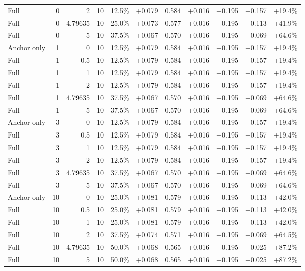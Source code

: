 \begin{table}[htbp]
\begin{tabular}{lrrrccccccc}
Full & 0 & 2 & 10 & 12.5\% & +0.079 & 0.584 & +0.016 & +0.195 & +0.157 & +19.4\% \\
Full & 0 & 4.79635 & 10 & 25.0\% & +0.073 & 0.577 & +0.016 & +0.195 & +0.113 & +41.9\% \\
Full & 0 & 5 & 10 & 37.5\% & +0.067 & 0.570 & +0.016 & +0.195 & +0.069 & +64.6\% \\
Anchor only & 1 & 0 & 10 & 12.5\% & +0.079 & 0.584 & +0.016 & +0.195 & +0.157 & +19.4\% \\
Full & 1 & 0.5 & 10 & 12.5\% & +0.079 & 0.584 & +0.016 & +0.195 & +0.157 & +19.4\% \\
Full & 1 & 1 & 10 & 12.5\% & +0.079 & 0.584 & +0.016 & +0.195 & +0.157 & +19.4\% \\
Full & 1 & 2 & 10 & 12.5\% & +0.079 & 0.584 & +0.016 & +0.195 & +0.157 & +19.4\% \\
Full & 1 & 4.79635 & 10 & 37.5\% & +0.067 & 0.570 & +0.016 & +0.195 & +0.069 & +64.6\% \\
Full & 1 & 5 & 10 & 37.5\% & +0.067 & 0.570 & +0.016 & +0.195 & +0.069 & +64.6\% \\
Anchor only & 3 & 0 & 10 & 12.5\% & +0.079 & 0.584 & +0.016 & +0.195 & +0.157 & +19.4\% \\
Full & 3 & 0.5 & 10 & 12.5\% & +0.079 & 0.584 & +0.016 & +0.195 & +0.157 & +19.4\% \\
Full & 3 & 1 & 10 & 12.5\% & +0.079 & 0.584 & +0.016 & +0.195 & +0.157 & +19.4\% \\
Full & 3 & 2 & 10 & 12.5\% & +0.079 & 0.584 & +0.016 & +0.195 & +0.157 & +19.4\% \\
Full & 3 & 4.79635 & 10 & 37.5\% & +0.067 & 0.570 & +0.016 & +0.195 & +0.069 & +64.6\% \\
Full & 3 & 5 & 10 & 37.5\% & +0.067 & 0.570 & +0.016 & +0.195 & +0.069 & +64.6\% \\
Anchor only & 10 & 0 & 10 & 25.0\% & +0.081 & 0.579 & +0.016 & +0.195 & +0.113 & +42.0\% \\
Full & 10 & 0.5 & 10 & 25.0\% & +0.081 & 0.579 & +0.016 & +0.195 & +0.113 & +42.0\% \\
Full & 10 & 1 & 10 & 25.0\% & +0.081 & 0.579 & +0.016 & +0.195 & +0.113 & +42.0\% \\
Full & 10 & 2 & 10 & 37.5\% & +0.074 & 0.571 & +0.016 & +0.195 & +0.069 & +64.5\% \\
Full & 10 & 4.79635 & 10 & 50.0\% & +0.068 & 0.565 & +0.016 & +0.195 & +0.025 & +87.2\% \\
Full & 10 & 5 & 10 & 50.0\% & +0.068 & 0.565 & +0.016 & +0.195 & +0.025 & +87.2\% \\

\end{tabular}
\end{table}
